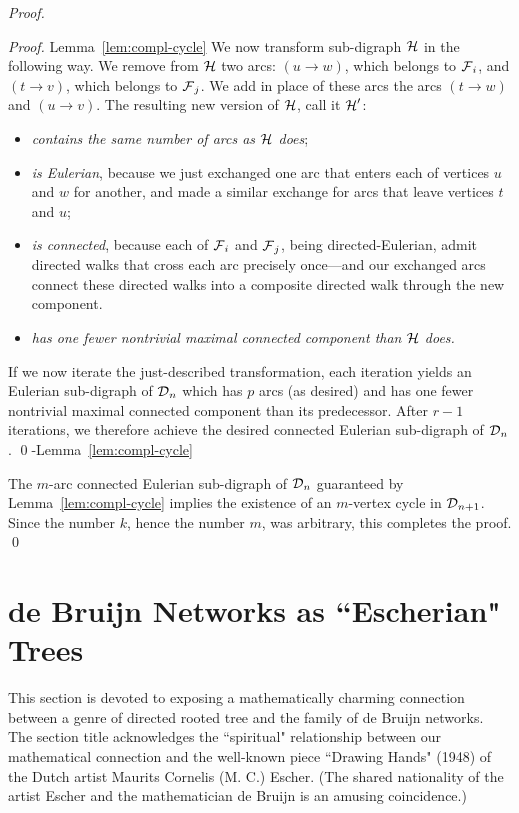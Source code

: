\begin{proof}
\begin{proof}{Lemma~\ref{lem:compl-cycle}}
We now transform sub-digraph $\mbox{$\cal H$}$ in the following way. We remove from $\mbox{$\cal H$}$ two arcs: 
$(u \rightarrow w)$, which belongs to $\mbox{$\cal F$}_i$, and $(t \rightarrow v)$, which belongs to $\mbox{$\cal F$}_j$.  We
add in place of these arcs the arcs $(t \rightarrow w)$ and $(u \rightarrow v)$.  The resulting
new version of $\mbox{$\cal H$}$, call it $\mbox{$\cal H$}'$:
\begin{itemize}
\item
{\em contains the same number of arcs as $\mbox{$\cal H$}$ does};
\item
{\em is Eulerian}, because we just exchanged one arc that enters each of vertices $u$ and $w$
for another, and made a similar exchange for arcs that leave vertices $t$ and $u$;
\item
{\em is connected}, because each of $\mbox{$\cal F$}_i$ and $\mbox{$\cal F$}_j$, being directed-Eulerian, admit directed walks
that cross each arc precisely once---and our exchanged arcs connect these directed walks into
a composite directed walk through the new component.
\item
{\em has one fewer nontrivial maximal connected component than $\mbox{$\cal H$}$ does.}
\end{itemize}

If we now iterate the just-described transformation, each iteration yields an Eulerian sub-digraph
of $\mbox{$\cal D$}_n$ which has $p$ arcs (as desired) and has one fewer nontrivial maximal connected 
component than its predecessor.  After $r-1$ iterations, we therefore achieve the desired connected
Eulerian sub-digraph of $\mbox{$\cal D$}_n$.
\qed-Lemma~\ref{lem:compl-cycle}
\end{proof}

The $m$-arc connected Eulerian sub-digraph of $\mbox{$\cal D$}_n$ guaranteed by
Lemma~\ref{lem:compl-cycle} implies the existence of an $m$-vertex cycle in $\mbox{$\cal D$}_{n+1}$.  Since
the number $k$, hence the number $m$, was arbitrary, this completes the proof.  \qed
\end{proof}


\section{de Bruijn Networks as ``Escherian" Trees} 
\label{Appendix:tree-DB}

This section is devoted to exposing a mathematically charming connection between a genre of
directed rooted tree and the family of de Bruijn networks.  The section title acknowledges the 
``spiritual" relationship between our mathematical connection and the well-known piece 
``Drawing Hands" (1948) of the Dutch artist Maurits Cornelis (M. C.) Escher.  (The shared
nationality of the artist Escher and the mathematician de Bruijn is an amusing coincidence.)

